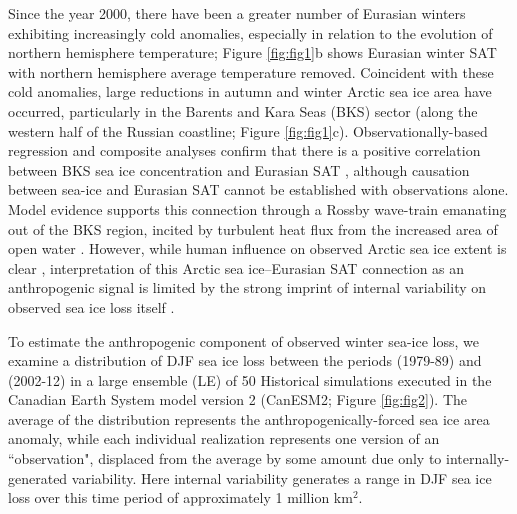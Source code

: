 \documentclass{nature}
\begin{document}
Since the year 2000, there have been a greater number of Eurasian winters exhibiting increasingly cold anomalies, especially in relation to the evolution of northern hemisphere temperature; Figure \ref{fig:fig1}b shows Eurasian winter SAT with northern hemisphere average temperature removed. Coincident with these cold anomalies, large reductions in autumn and winter Arctic sea ice area have occurred, particularly in the Barents and Kara Seas (BKS) sector (along the western half of the Russian coastline; Figure \ref{fig:fig1}c). Observationally-based regression and composite analyses confirm that there is a positive correlation between BKS sea ice concentration and Eurasian SAT \cite{inoue12,outten12}, although causation between sea-ice and Eurasian SAT cannot be established with observations alone. Model evidence supports this connection through a Rossby wave-train emanating out of the BKS region, incited by turbulent heat flux from the increased area of open water \cite{honda09,petoukhov10,mori14,kim14,peings14}. However, while human influence on observed Arctic sea ice extent is clear \cite{min08}, interpretation of this Arctic sea ice--Eurasian SAT connection as an anthropogenic signal is limited by the strong imprint of internal variability on observed sea ice loss itself \cite{swart15}. %

To estimate the anthropogenic component of observed winter sea-ice loss, we examine a distribution of DJF sea ice loss between the periods (1979-89) and (2002-12) in a large ensemble (LE) of 50 Historical simulations executed in the Canadian Earth System model version 2 (CanESM2; Figure \ref{fig:fig2}). The average of the distribution represents the anthropogenically-forced sea ice area anomaly, while each individual realization represents one version of an ``observation", displaced from the average by some amount due only to internally-generated variability. Here internal variability generates a range in DJF sea ice loss over this time period of approximately 1 million km$^2$. 
\end{document}

